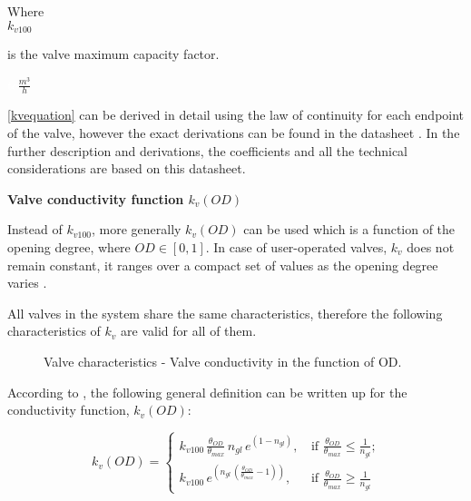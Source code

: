 \begin{minipage}[t]{0.20\textwidth}
Where\\
\hspace*{8mm} $k_{v100}$ 
\end{minipage}
\begin{minipage}[t]{0.68\textwidth}
\vspace*{2mm}
is the valve maximum capacity factor.
 \end{minipage}
\begin{minipage}[t]{0.10\textwidth}
\vspace*{2mm}
\textcolor{White}{te}$\unit{\frac{m^{3}}{h}}$
\end{minipage}

\eqref{kvequation} can be derived in detail using the law of continuity for each endpoint of the valve, however the exact derivations can be found in the datasheet \cite{kvvalve}. In the further description and derivations, the coefficients and all the technical considerations are based on this datasheet.  

\textbf{Valve conductivity function \texorpdfstring{$k_v(OD)$}{}}
\label{OD}

Instead of $k_{v100}$, more generally $k_v(OD)$ can be used which is a function of the opening degree, where $OD \in  [0,1]$. In case of user-operated valves, $k_{v}$ does not remain constant, it ranges over a compact set of values as the opening degree varies \cite{Kallesoe2009}.

All valves in the system share the same characteristics, therefore the following characteristics of $k_{v}$ are valid for all of them. 


\begin{figure}[H]
\centering
 
\caption{Valve characteristics - Valve conductivity in the function of OD.}
\label{valve_conductivity}
\end{figure}

According to \cite{keller}, the following general definition can be written up for the conductivity function, $k_v(OD)$:


\begin{equation}
\label{kvFunction}
 k_v(OD) =
		\left\{
		\begin{array}{ll}
		
		k_{v100} \, \frac{\theta_{OD}}{\theta_{max}} \, n_{gl} \, e^{(1-n_{gl})} \text{,} & \mbox{ if } 								\frac{\theta_{OD}}{\theta_{max}} \leq \frac{1}					{n_{gl}} \text{;}
\\
		k_{v100} \, e^{(n_{gl} \,(\frac{\theta_{OD}}{\theta_{max}}-1))} \text{,} & \mbox{ if } \frac{\theta_{OD}}{\theta_{max}} \geq \frac{1}{n_{gl}}

		\end{array}
		\right.
\end{equation}	

